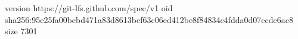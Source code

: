 version https://git-lfs.github.com/spec/v1
oid sha256:95e25fa00bebd471a83d8613bef63c06ed412be8f84834c4fdda0d07ccde6ac8
size 7301
